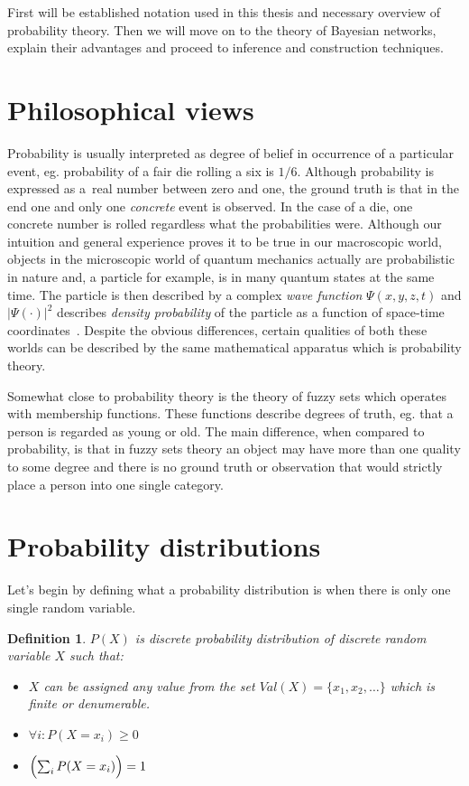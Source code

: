 \documentclass[english,cover]{fitthesis} %
\newtheorem{math_def}{Definition}[chapter] %
\newcommand{\term}[1]{\emph{#1}}           %
\begin{document}
First will be established notation used in this thesis and necessary overview of probability theory. Then we will move on to the theory of Bayesian networks, explain their advantages and proceed to inference and construction techniques.



\section{Philosophical views}
Probability is usually interpreted as degree of belief in occurrence of a particular event, eg. probability of a fair die rolling a six is $1/6$. Although probability is expressed as a~real number between zero and one, the ground truth is that in the end one and only one \emph{concrete} event is observed. In the case of a die, one concrete number is rolled regardless what the probabilities were. Although our intuition and general experience proves it to be true in our macroscopic world, objects in the microscopic world of quantum mechanics actually are probabilistic in nature and, a particle for example, is in many quantum states at the same time. The particle is then described by a complex \term{wave function} $\Psi(x,y,z,t)$ and $\vert\Psi(\cdot)\vert^2$ describes \term{density probability} of the particle as a function of space-time coordinates~\cite[p.~1044]{hrw_physics}. Despite the obvious differences, certain qualities of both these worlds can be described by the same mathematical apparatus which is probability theory.

Somewhat close to probability theory is the theory of fuzzy sets which operates with membership functions. These functions describe degrees of truth, eg. that a person is regarded as young or old. The main difference, when compared to probability, is that in fuzzy sets theory an object may have more than one quality to some degree and there is no ground truth or observation that would strictly place a person into one single category.


\section{Probability distributions}
Let's begin by defining what a probability distribution is when there is only one single random variable.
\begin{math_def}\label{def_prob_distribution}
    $P(X)$ is discrete probability distribution of discrete random variable $X$ such that:
    \begin{itemize}
        \item $X$ can be assigned any value from the set $Val(X) = \lbrace x_1, x_2, \dots \rbrace$ which is finite or denumerable.
        \item $\forall i: P(X = x_i) \geq 0$
        \item $\Bigl( \sum_i P(X = x_i) \Bigr) = 1$
    \end{itemize}
\end{math_def}
\end{document}
